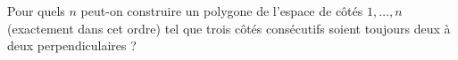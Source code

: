 Pour quels $n$ peut-on construire un polygone de l'espace de côtés $1, \ldots, n$ (exactement dans cet ordre) tel que trois côtés consécutifs soient toujours deux à deux perpendiculaires ?
